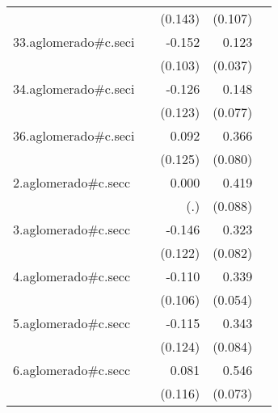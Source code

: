 {\begin{longtable}{l*{4}{D{.}{.}{-1}}}
            &                     &     (0.143)         &     (0.107)         &                     \\
\addlinespace
33.aglomerado#c.seci&                     &      -0.152         &       0.123\sym{***}&                     \\
            &                     &     (0.103)         &     (0.037)         &                     \\
\addlinespace
34.aglomerado#c.seci&                     &      -0.126         &       0.148         &                     \\
            &                     &     (0.123)         &     (0.077)         &                     \\
\addlinespace
36.aglomerado#c.seci&                     &       0.092         &       0.366\sym{***}&                     \\
            &                     &     (0.125)         &     (0.080)         &                     \\
\addlinespace
2.aglomerado#c.secc&                     &       0.000         &       0.419\sym{***}&                     \\
            &                     &         (.)         &     (0.088)         &                     \\
\addlinespace
3.aglomerado#c.secc&                     &      -0.146         &       0.323\sym{***}&                     \\
            &                     &     (0.122)         &     (0.082)         &                     \\
\addlinespace
4.aglomerado#c.secc&                     &      -0.110         &       0.339\sym{***}&                     \\
            &                     &     (0.106)         &     (0.054)         &                     \\
\addlinespace
5.aglomerado#c.secc&                     &      -0.115         &       0.343\sym{***}&                     \\
            &                     &     (0.124)         &     (0.084)         &                     \\
\addlinespace
6.aglomerado#c.secc&                     &       0.081         &       0.546\sym{***}&                     \\
            &                     &     (0.116)         &     (0.073)         &                     \\

\end{longtable}}

